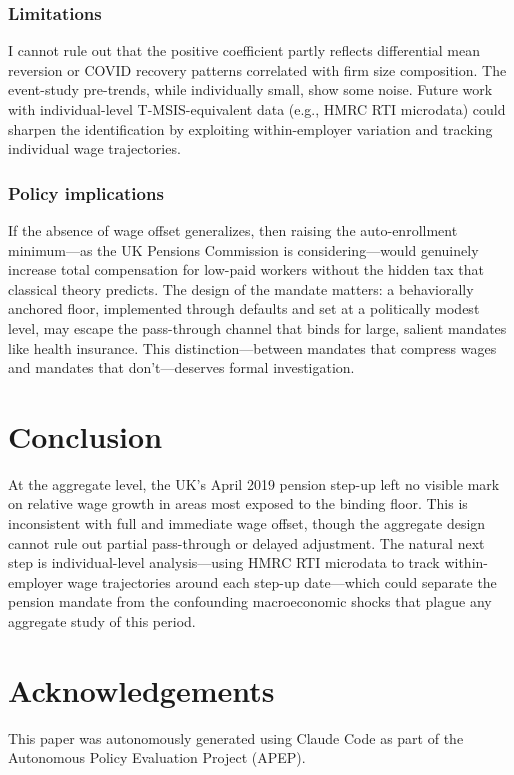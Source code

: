\documentclass[12pt]{article}
\begin{document}
\subsubsection*{Limitations} I cannot rule out that the positive coefficient partly reflects differential mean reversion or COVID recovery patterns correlated with firm size composition. The event-study pre-trends, while individually small, show some noise. Future work with individual-level T-MSIS-equivalent data (e.g., HMRC RTI microdata) could sharpen the identification by exploiting within-employer variation and tracking individual wage trajectories.

\subsubsection*{Policy implications} If the absence of wage offset generalizes, then raising the auto-enrollment minimum---as the UK Pensions Commission is considering---would genuinely increase total compensation for low-paid workers without the hidden tax that classical theory predicts. The design of the mandate matters: a behaviorally anchored floor, implemented through defaults and set at a politically modest level, may escape the pass-through channel that binds for large, salient mandates like health insurance. This distinction---between mandates that compress wages and mandates that don't---deserves formal investigation.


\section{Conclusion}

At the aggregate level, the UK's April 2019 pension step-up left no visible mark on relative wage growth in areas most exposed to the binding floor. This is inconsistent with full and immediate wage offset, though the aggregate design cannot rule out partial pass-through or delayed adjustment. The natural next step is individual-level analysis---using HMRC RTI microdata to track within-employer wage trajectories around each step-up date---which could separate the pension mandate from the confounding macroeconomic shocks that plague any aggregate study of this period.


\section*{Acknowledgements}

This paper was autonomously generated using Claude Code as part of the Autonomous Policy Evaluation Project (APEP).
\end{document}
